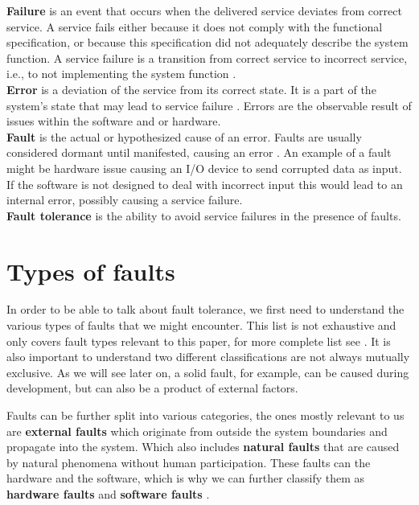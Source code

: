 \documentclass[12pt, letterpaper]{article}
\begin{document}
\textbf{Failure} is an event that occurs when the delivered service deviates from correct service. A service fails either because it does not comply with the functional specification, or because this specification did not adequately describe the system function. A service failure is a transition from correct service to incorrect service, i.e., to not implementing the system function \cite{1335465}. \\

\textbf{Error} is a deviation of the service from its correct state. It is a part of the system's state that may lead to service failure \cite{1335465}. Errors are the observable result of issues within the software and or hardware. \\

\textbf{Fault} is the actual or hypothesized cause of an error. Faults are usually considered dormant until manifested, causing an error \cite{1335465}. An example of a fault might be hardware issue causing an I/O device to send corrupted data as input. If the software is not designed to deal with incorrect input this would lead to an internal error, possibly causing a service failure. \\

\textbf{Fault tolerance} is the ability to avoid service failures in the presence of faults. 

\section{Types of faults}

In order to be able to talk about fault tolerance, we first need to understand the various types of faults that we might encounter. This list is not exhaustive and only covers fault types relevant to this paper, for more complete list see \cite{1335465}. It is also important to understand two different classifications are not always mutually exclusive. As we will see later on, a solid fault, for example, can be caused during development, but can also be a product of external factors.

Faults can be further split into various categories, the ones mostly relevant to us are \textbf{external faults} which originate from outside the system boundaries and propagate into the system. Which also includes \textbf{natural faults} that are caused by natural phenomena without human participation. These faults can the hardware and the software, which is why we can further classify them as \textbf{hardware faults} and \textbf{software faults} \cite{1335465}. \\
\end{document}
